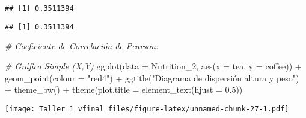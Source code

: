 \documentclass[
]{article}
\newenvironment{Shaded}{\begin{snugshade}}{\end{snugshade}}
\newcommand{\AttributeTok}[1]{\textcolor[rgb]{0.77,0.63,0.00}{#1}}
\newcommand{\CommentTok}[1]{\textcolor[rgb]{0.56,0.35,0.01}{\textit{#1}}}
\newcommand{\FloatTok}[1]{\textcolor[rgb]{0.00,0.00,0.81}{#1}}
\newcommand{\FunctionTok}[1]{\textcolor[rgb]{0.00,0.00,0.00}{#1}}
\newcommand{\NormalTok}[1]{#1}
\newcommand{\SpecialCharTok}[1]{\textcolor[rgb]{0.00,0.00,0.00}{#1}}
\newcommand{\StringTok}[1]{\textcolor[rgb]{0.31,0.60,0.02}{#1}}
\begin{document}
\begin{verbatim}
## [1] 0.3511394
\end{verbatim}

\begin{Shaded}
\end{Shaded}

\begin{verbatim}
## [1] 0.3511394
\end{verbatim}

\begin{Shaded}
\begin{Highlighting}[]
\CommentTok{\# Coeficiente de Correlación de Pearson:}


\CommentTok{\# Gráfico Simple (X,Y)}
\FunctionTok{ggplot}\NormalTok{(}\AttributeTok{data =}\NormalTok{ Nutrition\_2, }\FunctionTok{aes}\NormalTok{(}\AttributeTok{x =}\NormalTok{ tea, }\AttributeTok{y =}\NormalTok{ coffee)) }\SpecialCharTok{+} 
  \FunctionTok{geom\_point}\NormalTok{(}\AttributeTok{colour =} \StringTok{"red4"}\NormalTok{) }\SpecialCharTok{+}
  \FunctionTok{ggtitle}\NormalTok{(}\StringTok{"Diagrama de dispersión altura y peso"}\NormalTok{) }\SpecialCharTok{+}
  \FunctionTok{theme\_bw}\NormalTok{() }\SpecialCharTok{+}
  \FunctionTok{theme}\NormalTok{(}\AttributeTok{plot.title =} \FunctionTok{element\_text}\NormalTok{(}\AttributeTok{hjust =} \FloatTok{0.5}\NormalTok{))}
\end{Highlighting}
\end{Shaded}

\texttt{[image: Taller\_1\_vfinal\_files/figure-latex/unnamed-chunk-27-1.pdf]}
\end{document}
